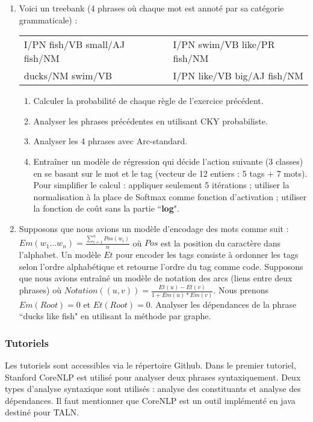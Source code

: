 \documentclass{KodeBook}
\begin{document}
\begin{enumerate}
	\item Voici un treebank  (4 phrases où chaque mot est annoté par sa catégorie grammaticale) :
	
	\begin{tabular}{|lll|}
		\hline
		I/PN fish/VB small/AJ fish/NM &&
		I/PN swim/VB like/PR fish/NM\\
		ducks/NM swim/VB &&
		I/PN like/VB big/AJ fish/NM \\
		\hline
	\end{tabular}
	
	\begin{enumerate}
		\item Calculer la probabilité de chaque règle de l'exercice précédent.
		\item Analyser les phrases précédentes en utilisant CKY probabiliste.
		\item Analyser les 4 phrases avec Arc-standard. 
		\item Entraîner un modèle de régression qui décide l'action suivante (3 classes) en se basant sur le mot et le tag (vecteur de 12 entiers : 5 tags + 7 mots). 
		Pour simplifier le calcul : appliquer seulement 5 itérations ; utiliser la normalisation à la place de Softmax comme fonction d'activation ; utiliser la fonction de coût sans la partie ``\textbf{log}".
	\end{enumerate}

	\item Supposons que nous avions un modèle d'encodage des mots comme suit : 
	$Em(w_1\dots w_n) = \frac{\sum_{i=1}^{n} Pos(w_i)}{n}$ où $Pos$ est la position du caractère dans l'alphabet. 
	Un modèle $Et$ pour encoder les tags consiste à ordonner les tags selon l'ordre alphabétique et retourne l'ordre du tag comme code.
	Supposons que nous avions entraîné un modèle de notation des arcs (liens entre deux phrases) où 
	$Notation((u, v)) = \frac{Et(u) - Et(v)}{1+ Em(u)*Em(v)}$.
	Nous prenons $Em(Root) = 0$ et $Et(Root) = 0$. 
	Analyser les dépendances de la phrase ``ducks like fish" en utilisant la méthode par graphe.
	
\end{enumerate}

\subsubsection*{Tutoriels}

Les tutoriels sont accessibles via le répertoire Github.
Dans le premier tutoriel, Stanford CoreNLP est utilisé pour analyser deux phrases syntaxiquement.
Deux types d'analyse syntaxique sont utilisés : analyse des constituants et analyse des dépendances.
Il faut mentionner que CoreNLP est un outil implémenté en java destiné pour TALN.
\end{document}
